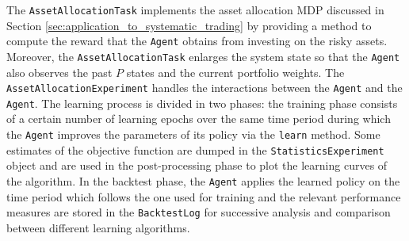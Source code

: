 \clearpage
The \lstinline{AssetAllocationTask} implements the asset allocation MDP discussed in Section \ref{sec:application_to_systematic_trading} by providing a method to compute the reward that the \lstinline{Agent} obtains from investing on the risky assets. Moreover, the \lstinline{AssetAllocationTask} enlarges the system state so that the \lstinline{Agent} also observes the past $P$ states and the current portfolio weights. 
The \lstinline{AssetAllocationExperiment} handles the interactions between the \lstinline{Agent} and the \lstinline{Agent}. The learning process is divided in two phases: the training phase consists of a certain number of learning epochs over the same time period during which the \lstinline{Agent} improves the parameters of its policy via the \lstinline{learn} method. Some estimates of the objective function are dumped in the \lstinline{StatisticsExperiment} object and are used in the post-processing phase to plot the learning curves of the algorithm. In the backtest phase, the \lstinline{Agent} applies the learned policy on the time period which follows the one used for training and the relevant performance measures are stored in the \lstinline{BacktestLog} for successive analysis and comparison between different learning algorithms.

